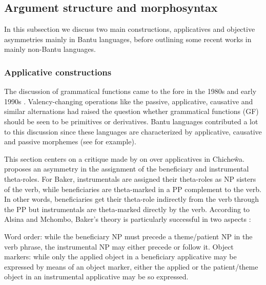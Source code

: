 \documentclass[output=paper,hidelinks]{langscibook}
\begin{document}
\subsection{Argument structure and morphosyntax}
\label{sec:African:2.2}

In this subsection we discuss two main constructions, applicatives and objective asymmetries mainly in Bantu languages, before outlining some recent works in mainly non-Bantu languages.

\largerpage[-1]
\subsubsection{Applicative constructions}


The discussion of grammatical functions came to the fore in the 1980s and early 1990s \citep{Marantz1984,Baker1988,Alsina1992,AlsinaMchombo1990,AlsinaMchombo:Appl,BresMosh90}. Valency-changing operations like the passive, applicative, causative and similar alternations had raised the question whether grammatical functions (GF) should be seen to be primitives or derivatives. Bantu languages contributed a lot to this discussion since these languages are characterized by applicative, causative and passive morphemes (see  for example). 

This section centers on a critique made by \citet{AlsinaMchombo1990} on \citet{Baker:Theta} over applicatives in Chiche\^wa. \citet{Baker:Theta} proposes an asymmetry in the assignment of the beneficiary and instrumental theta-roles. For Baker, instrumentals are assigned their theta-roles as NP sisters of the verb, while beneficiaries are theta-marked in a PP complement to the verb. In other words, beneficiaries get their theta-role indirectly from the verb through the PP but instrumentals are theta-marked directly by the verb. According to Alsina and Mchombo, Baker’s theory is particularly successful in two aspects \citep[495]{AlsinaMchombo1990}:

\begin{exe}\label{ex:African:13}
\ex \begin{xlist}
\ex Word order: while the beneficiary NP must precede a theme/patient NP in the verb phrase, the instrumental NP may either precede or follow it.
\ex Object markers: while only the applied object in a beneficiary
applicative may be expressed by means of an object marker, either the
applied or the patient/theme object in an instrumental applicative may
be so expressed.
\end{xlist}
\end{exe}
\end{document}
